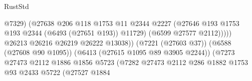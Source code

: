 \begin{lexlean}{RustStd}
\begin{coremodule}
                                                            @7329)
                                                          (@27638
                                                            @206
                                                            @118
                                                            @1753
                                                            @11
                                                            @2344
                                                            @2227
                                                            (@27646
                                                              @193
                                                              @1753
                                                              @193
                                                              @2344
                                                              (@6493 (@27651 @193))
                                                              @11729)
                                                            (@6599 @27577 @2112)))))
                                                    @26213
                                                    @26216
                                                    @26219
                                                    @26222
                                                    @13038))
                                                (@7221 (@27603 @37))
                                                (@6588 (@27608 @90 @1095))
                                                (@6413 (@27615 @1095 @89 @3905 @2244))
                                                (@7273
                                                  @27473
                                                  @2112
                                                  @1886
                                                  @1856
                                                  @5723
                                                  (@7282
                                                    @27473
                                                    @2112
                                                    @286
                                                    @1882
                                                    @1753
                                                    @93
                                                    @2433
                                                    @5722
                                                    (@27527
                                                      @1884

\end{coremodule}
\end{lexlean}
